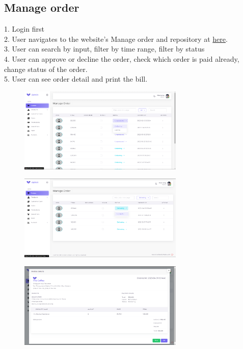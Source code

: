 \subsection{Manage order}
1. Login first \\
2. User navigates to the website's Manage order and repository at \href{https://coffee.skrt.cc/admin/order}{here}. \\
3. User can search by input, filter by time range, filter by status\\
4. User can approve or decline the order, check which order is paid already, change status of the order.\\
5. User can see order detail and print the bill.\\

\begin{figure}[H]
    \centering
    \includegraphics[width=0.7\textwidth]{Demo/Screenshot_22.png}
    \label{fig:supportpage}
\end{figure}
\begin{figure}[H]
    \centering
    \includegraphics[width=0.7\textwidth]{Demo/Screenshot_23.png}
    \label{fig:supportpage}
\end{figure}
\begin{figure}[H]
    \centering
    \includegraphics[width=0.7\textwidth]{Demo/Screenshot_24.png}
    \label{fig:supportpage}
\end{figure}

